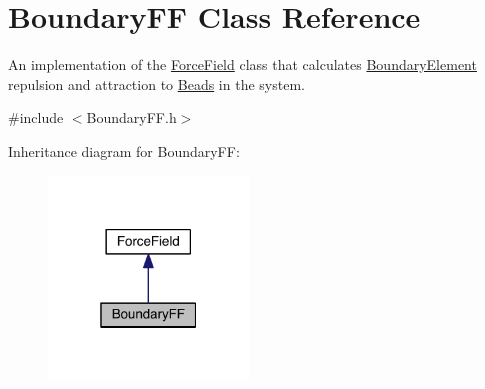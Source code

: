 \hypertarget{classBoundaryFF}{\section{Boundary\+F\+F Class Reference}
\label{classBoundaryFF}
}


An implementation of the \hyperlink{classForceField}{Force\+Field} class that calculates \hyperlink{classBoundaryElement}{Boundary\+Element} repulsion and attraction to \hyperlink{classBead}{Beads} in the system.  




{\ttfamily \#include $<$Boundary\+F\+F.\+h$>$}



Inheritance diagram for Boundary\+F\+F\+:\nopagebreak
\begin{figure}[H]
\begin{center}
\leavevmode
\includegraphics[width=151pt]{classBoundaryFF__inherit__graph}
\end{center}
\end{figure}


